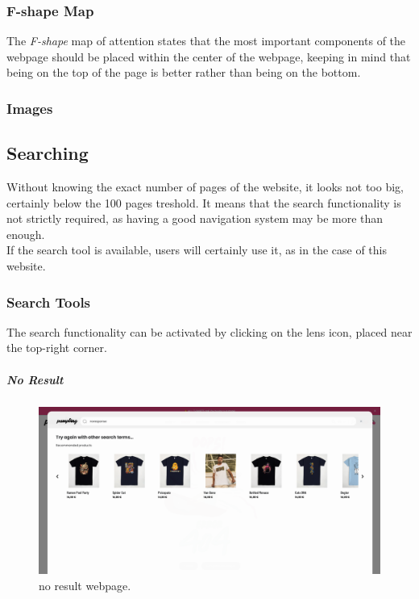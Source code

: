 \subsubsection{F-shape Map}
The \textit{F-shape} map of attention states that the most important components of the webpage should be placed within the center of the webpage, keeping in mind that being on the top of the page is better rather than being on the bottom.\\

\subsubsection{Images}

\subsection{Searching}
Without knowing the exact number of pages of the website, it looks not too big, certainly below the 100 pages treshold. It means that the search functionality is not strictly required, as having a good navigation system may be more than enough.\\
If the search tool is available, users will certainly use it, as in the case of this website.

\subsubsection{Search Tools}
The search functionality can be activated by clicking on the lens icon, placed near the top-right corner.


\subparagraph{No Result}
\begin{figure}[h!]
	\centering
	\includegraphics[scale=0.225]{images/zero-res.png}
	\caption{no result webpage.}
	\label{fig:zero-res}
\end{figure}

